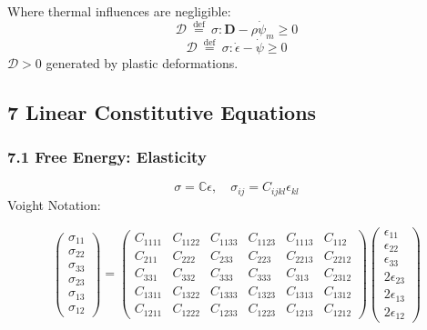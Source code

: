 Where thermal influences are negligible:
\[\mathcal{D} \stackrel{\text { def }}{=} \sigma: \mathbf{D}-\rho \dot{\psi}_{m} \geq 0\]
\[\boxed{\mathcal{D} \stackrel{\text { def }}{=} \sigma: \dot{\epsilon}-\dot{\psi} \geq 0}\]
\(\mathcal{D} >0\) generated by plastic deformations.

\hypertarget{linear-constitutive-equations}{%
\subsection{7 Linear Constitutive
Equations}\label{linear-constitutive-equations}}

\hypertarget{free-energy-elasticity}{%
\subsubsection{7.1 Free Energy:
Elasticity}\label{free-energy-elasticity}}

\[\sigma=\mathbb{C} \epsilon, \quad \sigma_{i j}=C_{i j k l} \epsilon_{k l}\]
Voight Notation:

\[\left(\begin{array}{l}{\sigma_{11}} \\ {\sigma_{22}} \\ {\sigma_{33}} \\ {\sigma_{23}} \\ {\sigma_{13}} \\ {\sigma_{12}}\end{array}\right)=\left(\begin{array}{cccccc}{C_{1111}} & {C_{1122}} & {C_{1133}} & {C_{1123}} & {C_{1113}} & {C_{112}} \\ {C_{211}} & {C_{222}} & {C_{233}} & {C_{223}} & {C_{2213}} & {C_{2212}} \\ {C_{331}} & {C_{332}} & {C_{333}} & {C_{333}} & {C_{313}} & {C_{2312}} \\ {C_{1311}} & {C_{1322}} & {C_{1333}} & {C_{1323}} & {C_{1313}} & {C_{1312}} \\ {C_{1211}} & {C_{1222}} & {C_{1233}} & {C_{1223}} & {C_{1213}} & {C_{1212}}\end{array}\right)\left(\begin{array}{c}{\epsilon_{11}} \\ {\epsilon_{22}} \\ {\epsilon_{33}} \\ {2 \epsilon_{23}} \\ {2 \epsilon_{13}} \\ {2 \epsilon_{12}}\end{array}\right)\]

